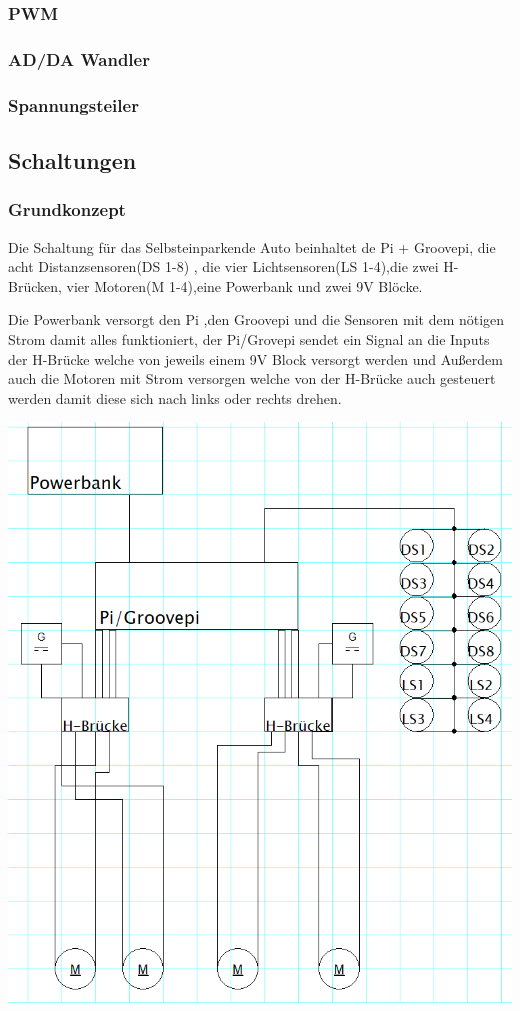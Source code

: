 \documentclass[notitlepage]{report}
\begin{document}
\subsubsection{PWM}

\subsubsection{AD/DA Wandler}

\subsubsection{Spannungsteiler}

\subsection{Schaltungen}

\subsubsection{Grundkonzept}

Die Schaltung für das Selbsteinparkende Auto beinhaltet de Pi + Groovepi, die acht Distanzsensoren(DS 1-8) , die vier Lichtsensoren(LS 1-4),die zwei H-Brücken, vier Motoren(M 1-4),eine Powerbank und zwei 9V Blöcke.

Die Powerbank versorgt den Pi ,den Groovepi und die Sensoren mit dem nötigen Strom damit alles funktioniert, der Pi/Grovepi sendet ein Signal an die Inputs der H-Brücke welche von jeweils einem 9V Block versorgt werden und Außerdem auch die Motoren mit Strom versorgen welche von der H-Brücke auch gesteuert werden damit diese sich nach links oder rechts drehen.

\includegraphics[scale=0.5]{1.png}
\end{document}

